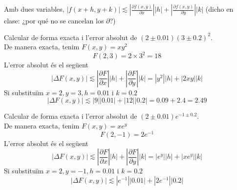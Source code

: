 \documentclass[../main.tex]{subfiles}
\begin{document}
    \begin{definicio}
        Amb dues variables, $\left\lvert f(x+h, y+k) \right\rvert \lesssim \left\lvert \frac{\partial f\left( x,y \right)}{\partial x} \right\rvert\left\lvert h \right\rvert + \left\lvert \frac{\partial f\left( x,y \right)}{\partial y} \right\rvert\left\lvert k \right\rvert$ (dicho en clase: ¿por qué no se cancelan los $\partial$?)
    \end{definicio}
    \begin{exercici}
        Calcular de forma exacta i l'error absolut de $(2\pm 0.01)(3\pm 0.2)^2$.\\
        De manera exacta, tenim $F\left( x,y \right) = xy^2$
        \begin{displaymath}
            F\left( 2, 3 \right) = 2\times3^2 = 18
        \end{displaymath}
        L'error absolut és el següent
        \begin{displaymath}
            \left\lvert \Delta F\left( x,y \right) \right\rvert \lesssim \left\lvert \frac{\partial F}{\partial x} \right\rvert\left\lvert h \right\rvert +  \left\lvert \frac{\partial F}{\partial y} \right\rvert\left\lvert k \right\rvert = \left\lvert y^2 \right\rvert\left\lvert h \right\rvert + \left\lvert 2xy \right\rvert\left\lvert k \right\rvert
        \end{displaymath}
        Si substituïm $x = 2, y = 3, h = 0.01$ i $k = 0.2$
        \begin{displaymath}
            \left\lvert \Delta F\left( x,y \right) \right\rvert \lesssim \left\lvert 9 \right\rvert\left\lvert 0.01 \right\rvert + \left\lvert 12 \right\rvert\left\lvert 0.2 \right\rvert = 0.09+2.4 = 2.49
        \end{displaymath}
    \end{exercici}
    \begin{exercici}
        Calcular de forma exacta i l'error absolut de $(2\pm 0.01)e^{-1\pm 0.2}$.\\
        De manera exacta, tenim $F\left( x,y \right) = xe^y$
        \begin{displaymath}
            F(2, -1) = 2e^{-1}
        \end{displaymath}
        L'error absolut és el següent
        \begin{displaymath}
            \left\lvert \Delta F\left( x,y \right) \right\rvert \lesssim \left\lvert \frac{\partial F}{\partial x} \right\rvert\left\lvert h \right\rvert +  \left\lvert \frac{\partial F}{\partial y} \right\rvert\left\lvert k \right\rvert = \left\lvert e^y \right\rvert\left\lvert h \right\rvert + \left\lvert xe^y \right\rvert\left\lvert k \right\rvert
        \end{displaymath}
        Si substituïm $x = 2, y = -1, h = 0.01$ i $k = 0.2$
        \begin{displaymath}
            \left\lvert \Delta F\left( x,y \right) \right\rvert \lesssim \left\lvert e^{-1} \right\rvert\left\lvert 0.01 \right\rvert + \left\lvert 2e^{-1} \right\rvert\left\lvert 0.2 \right\rvert
        \end{displaymath}
    \end{exercici}
\end{document}

